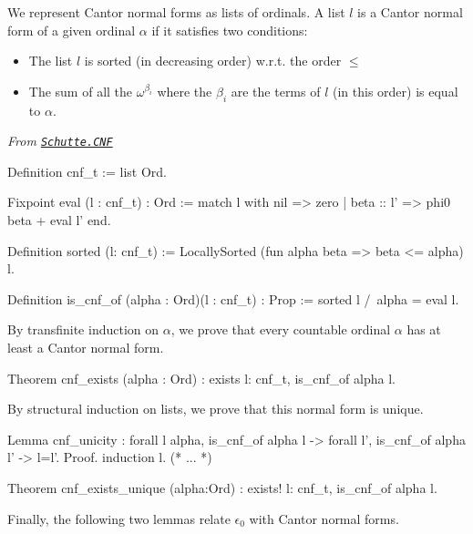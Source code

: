 {We represent  Cantor normal forms as lists of ordinals.
A  list $l$ is a Cantor normal form of a given ordinal $\alpha$ if it satisfies two conditions:



\begin{itemize}
\item The list  $l$ is sorted (in decreasing order) w.r.t. the order $\leq$
\item The sum of all the  $\omega^{\beta_i}$ where the $\beta_i$ are the terms of $l$ (in this order) is equal to $\alpha$.
\end{itemize}



\vspace{4pt}

\noindent\emph{From \href{../theories/html/hydras.Schutte.CNF.html\#cnf_t}%
{\texttt{Schutte.CNF}}}


\begin{Coqsrc}
 Definition cnf_t := list Ord.

Fixpoint eval (l : cnf_t) : Ord :=
  match l with nil => zero
              | beta :: l' => phi0 beta + eval l'
  end.

Definition sorted (l: cnf_t) :=
  LocallySorted (fun alpha beta => beta <= alpha) l.

Definition is_cnf_of (alpha : Ord)(l : cnf_t) : Prop :=
  sorted l /\ alpha = eval l.
\end{Coqsrc}


By transfinite induction on $\alpha$, we prove that every countable ordinal $\alpha$ 
 has at least a Cantor normal form.

\begin{Coqsrc}
Theorem cnf_exists (alpha : Ord) :
  exists l: cnf_t, is_cnf_of alpha l.
\end{Coqsrc}

By structural induction on lists, we prove that this normal form is unique.

\begin{Coqsrc}
 Lemma cnf_unicity : forall l alpha, 
   is_cnf_of alpha l -> 
   forall l',  is_cnf_of alpha l' -> l=l'.
Proof.
 induction l.
 (*  ...  *)

Theorem cnf_exists_unique (alpha:Ord) :
  exists! l: cnf_t, is_cnf_of alpha l.
\end{Coqsrc}


Finally, the following two lemmas relate  $\epsilon_0$ with Cantor normal forms.

}
